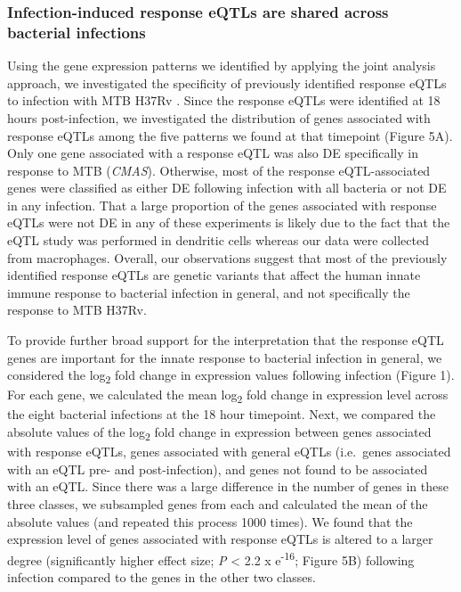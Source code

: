 \subsubsection{Infection-induced response eQTLs are shared across
bacterial
infections}\label{infection-induced-response-eqtls-are-shared-across-bacterial-infections}

Using the gene expression patterns we identified by applying the joint
analysis approach, we investigated the specificity of previously
identified response eQTLs to infection with MTB H37Rv
\citep{Barreiro2012}. Since the response eQTLs were identified at 18
hours post-infection, we investigated the distribution of genes
associated with response eQTLs among the five patterns we found at that
timepoint (Figure 5A). Only one gene associated with a response eQTL was
also DE specifically in response to MTB (\emph{CMAS}). Otherwise, most
of the response eQTL-associated genes were classified as either DE
following infection with all bacteria or not DE in any infection. That a
large proportion of the genes associated with response eQTLs were not DE
in any of these experiments is likely due to the fact that the eQTL
study was performed in dendritic cells whereas our data were collected
from macrophages. Overall, our observations suggest that most of the
previously identified response eQTLs are genetic variants that affect
the human innate immune response to bacterial infection in general, and
not specifically the response to MTB H37Rv.

To provide further broad support for the interpretation that the
response eQTL genes are important for the innate response to bacterial
infection in general, we considered the log\textsubscript{2} fold change
in expression values following infection (Figure 1). For each gene, we
calculated the mean log\textsubscript{2} fold change in expression level
across the eight bacterial infections at the 18 hour timepoint. Next, we
compared the absolute values of the log\textsubscript{2} fold change in
expression between genes associated with response eQTLs, genes
associated with general eQTLs (i.e.~genes associated with an eQTL pre-
and post-infection), and genes not found to be associated with an eQTL.
Since there was a large difference in the number of genes in these three
classes, we subsampled genes from each and calculated the mean of the
absolute values (and repeated this process 1000 times). We found that
the expression level of genes associated with response eQTLs is altered
to a larger degree (significantly higher effect size; \emph{P}
\textless{} 2.2 x e\textsuperscript{-16}; Figure 5B) following infection
compared to the genes in the other two classes.

